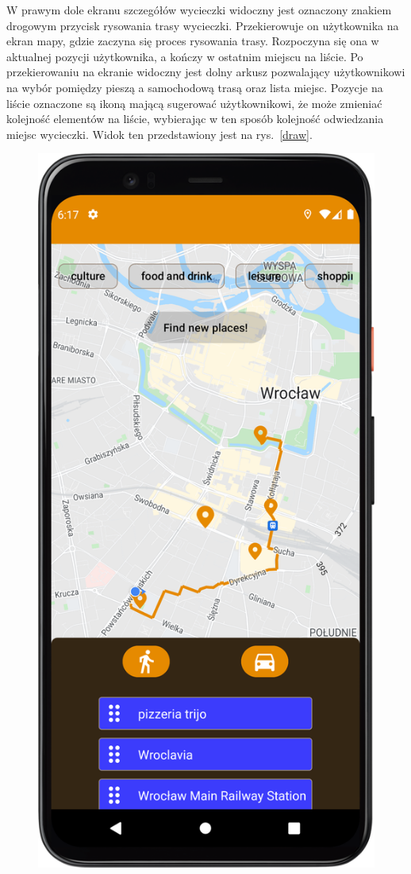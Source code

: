         W prawym dole ekranu szczegółów wycieczki widoczny jest oznaczony znakiem drogowym przycisk rysowania trasy wycieczki. Przekierowuje on użytkownika na ekran mapy, gdzie zaczyna się proces 
        rysowania trasy. Rozpoczyna się ona w aktualnej pozycji użytkownika, a kończy w ostatnim miejscu na liście. Po przekierowaniu na ekranie widoczny jest dolny arkusz pozwalający użytkownikowi
        na wybór pomiędzy pieszą a samochodową trasą oraz lista miejsc. Pozycje na liście oznaczone są ikoną mającą sugerować użytkownikowi, że może zmieniać kolejność elementów na liście,
        wybierając w ten sposób kolejność odwiedzania miejsc wycieczki. Widok ten przedstawiony jest na rys.~\ref{draw}.

        \vspace{1cm}
        \begin{figure}[H]
            \centering
            \includegraphics[scale=0.10]{src/app/drawing_trip.png}

\end{figure}
